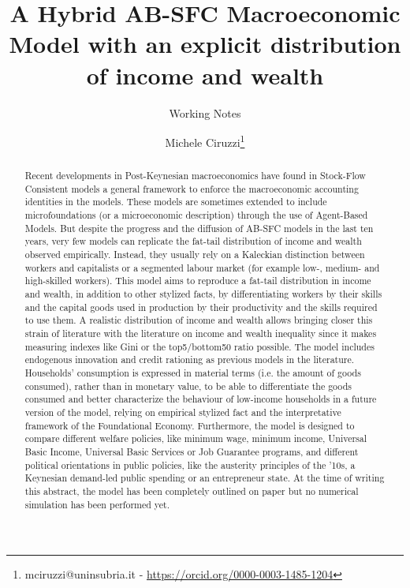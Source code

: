\documentclass[a4paper, headings=standardclasses]{scrartcl}
\title{A Hybrid AB-SFC Macroeconomic Model with an explicit distribution of income and wealth \let\thefootnote\relax\footnotetext{
	This version is intended to be submitted as a working paper to the 2023 STOREP Conference.

	An updated version of this paper and all the source code and the instructions required to replicate the paper will be available at \url{https://github.com/TnTo/FE/}
  }}
\subtitle{Working Notes}
\author{Michele Ciruzzi\thanks{mciruzzi@uninsubria.it - \url{https://orcid.org/0000-0003-1485-1204}}}
\begin{document}
\maketitle

\begin{abstract}
	Recent developments in Post-Keynesian macroeconomics have found in Stock-Flow Consistent models a general framework to enforce the macroeconomic accounting identities in the models.
	These models are sometimes extended to include microfoundations (or a microeconomic description) through the use of Agent-Based Models.
	But despite the progress and the diffusion of AB-SFC models in the last ten years, very few models can replicate the fat-tail distribution of income and wealth observed empirically.
	Instead, they usually rely on a Kaleckian distinction between workers and capitalists or a segmented labour market (for example low-, medium- and high-skilled workers).
	This model aims to reproduce a fat-tail distribution in income and wealth, in addition to other stylized facts, by differentiating workers by their skills and the capital goods used in production by their productivity and the skills required to use them.
	A realistic distribution of income and wealth allows bringing closer this strain of literature with the literature on income and wealth inequality since it makes measuring indexes like Gini or the top5/bottom50 ratio possible.
	The model includes endogenous innovation and credit rationing as previous models in the literature.
	Households' consumption is expressed in material terms (i.e. the amount of goods consumed), rather than in monetary value, to be able to differentiate the goods consumed and better characterize the behaviour of low-income households in a future version of the model, relying on empirical stylized fact and the interpretative framework of the Foundational Economy.
	Furthermore, the model is designed to compare different welfare policies, like minimum wage, minimum income, Universal Basic Income, Universal Basic Services or Job Guarantee programs, and different political orientations in public policies, like the austerity principles of the '10s, a Keynesian demand-led public spending or an entrepreneur state.
	At the time of writing this abstract, the model has been completely outlined on paper but no numerical simulation has been performed yet.
\end{abstract}
\end{document}
